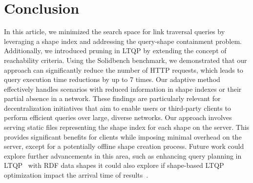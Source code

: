 \section{Conclusion}

In this article, we minimized the search space for link traversal queries by leveraging a shape index and addressing the query-shape containment problem.
Additionally, we introduced pruning in LTQP by extending the concept of reachability criteria.
Using the Solidbench benchmark, we demonstrated that our approach can significantly reduce the number of HTTP requests, which leads to query execution time reductions by up to 7 times.
Our adaptive method effectively handles scenarios with reduced information in shape indexes or their partial absence in a network.
These findings are particularly relevant for decentralization initiatives that aim to enable users or third-party clients to perform efficient queries over large, diverse networks.
Our approach involves serving static files representing the shape index for each shape on the server.
This provides significant benefits for clients while imposing minimal overhead on the server, except for a potentially offline shape creation process.
Future work could explore further advancements in this area, such as enhancing query planning in LTQP~\cite{taelman2024towards} with RDF data shapes
it could also explore if shape-based LTQP optimization impact the arrival time of results~\cite{Acosta2017}.


